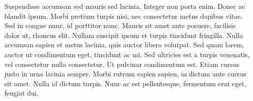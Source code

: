 \documentclass{article}
\begin{document}
Suspendisse accumsan sed mauris sed lacinia. Integer non porta enim. Donec ac blandit ipsum. Morbi pretium turpis nisi, nec consectetur metus dapibus vitae. Sed in congue nunc, id porttitor nunc. Mauris sit amet ante posuere, facilisis dolor ut, rhoncus elit. Nullam suscipit ipsum et turpis tincidunt fringilla. Nulla accumsan sapien et metus lacinia, quis auctor libero volutpat. Sed quam lorem, auctor ut condimentum eget, tincidunt ac mi. Sed ultricies est a turpis venenatis, vel consectetur nulla consectetur. Ut pulvinar condimentum est. Etiam cursus justo in urna lacinia semper. Morbi rutrum sapien sapien, in dictum ante cursus sit amet. Nulla id dictum turpis. Nunc ac est pellentesque, fermentum erat eget, feugiat dui. 
\end{document}
